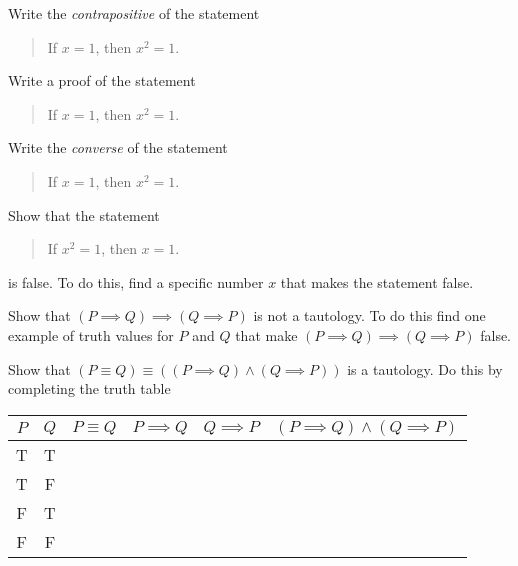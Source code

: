 \documentclass[12pt,fleqn,answers]{exam}
\begin{document}
\begin{questions} 

\question[5] Write the \emph{contrapositive} of the statement
\begin{quotation}
    If $x = 1$, then $x^2 = 1$.
\end{quotation}
\begin{solution}

\end{solution}

\question[5] Write a proof of the statement
\begin{quotation}
    If $x = 1$, then $x^2 = 1$.
\end{quotation}
\begin{solution}

\end{solution}

\question[5] Write the \emph{converse} of the statement
\begin{quotation}
    If $x = 1$, then $x^2 = 1$.
\end{quotation}
\begin{solution}

\end{solution}

\question[5]  Show that the statement
\begin{quotation}
    If $x^2 = 1$, then $x = 1$.
\end{quotation}
is false. To do this, find a specific number $x$ that makes the
statement false.
\begin{solution}

\end{solution}

\question Show that $(P \implies Q) \implies (Q \implies P)$ is not 
a tautology. To do this find one example of truth values for $P$ 
and $Q$ that make $(P \implies Q) \implies (Q \implies P)$ false.
\begin{solution}

\end{solution}

\question[5]  Show that $(P \equiv Q) \equiv \left ( (P \implies Q) 
\land (Q \implies P) \right )$ is a tautology. Do this by completing
the truth table

\begin{solution}

    \begin{tabular}{|c|c|c|c|c|c|}
        \hline
        $P$ & $Q$ & $P \equiv Q$ & $P \implies Q$ & $Q \implies P$ & $(P \implies Q) 
        \land (Q \implies P)$ \\ \hline \hline
        T & T &  &  & & \\ \hline
        T & F &  &  & & \\ \hline 
        F & T &  &  & & \\ \hline 
        F & F &  &  & & \\ \hline        
    \end{tabular}

\end{solution}
\end{questions}
\end{document}
